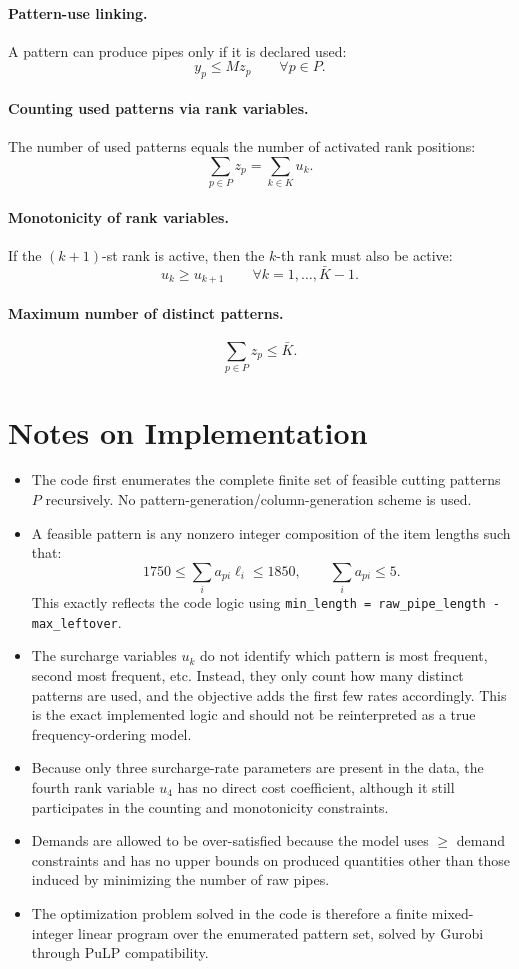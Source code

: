\paragraph{Pattern-use linking.}
A pattern can produce pipes only if it is declared used:
\[
y_p \le M z_p
\qquad \forall p\in P.
\]

\paragraph{Counting used patterns via rank variables.}
The number of used patterns equals the number of activated rank positions:
\[
\sum_{p\in P} z_p = \sum_{k\in K} u_k.
\]

\paragraph{Monotonicity of rank variables.}
If the $(k+1)$-st rank is active, then the $k$-th rank must also be active:
\[
u_k \ge u_{k+1}
\qquad \forall k=1,\dots,\bar K-1.
\]

\paragraph{Maximum number of distinct patterns.}
\[
\sum_{p\in P} z_p \le \bar K.
\]

\section*{Notes on Implementation}

\begin{itemize}
    \item The code first enumerates the complete finite set of feasible cutting patterns $P$ recursively. No pattern-generation/column-generation scheme is used.
    \item A feasible pattern is any nonzero integer composition of the item lengths such that:
    \[
    1750 \le \sum_i a_{pi}\ell_i \le 1850,
    \qquad
    \sum_i a_{pi}\le 5.
    \]
    This exactly reflects the code logic using \texttt{min\_length = raw\_pipe\_length - max\_leftover}.
    \item The surcharge variables $u_k$ do not identify which pattern is most frequent, second most frequent, etc. Instead, they only count how many distinct patterns are used, and the objective adds the first few rates accordingly. This is the exact implemented logic and should not be reinterpreted as a true frequency-ordering model.
    \item Because only three surcharge-rate parameters are present in the data, the fourth rank variable $u_4$ has no direct cost coefficient, although it still participates in the counting and monotonicity constraints.
    \item Demands are allowed to be over-satisfied because the model uses $\ge$ demand constraints and has no upper bounds on produced quantities other than those induced by minimizing the number of raw pipes.
    \item The optimization problem solved in the code is therefore a finite mixed-integer linear program over the enumerated pattern set, solved by Gurobi through PuLP compatibility.
\end{itemize}
